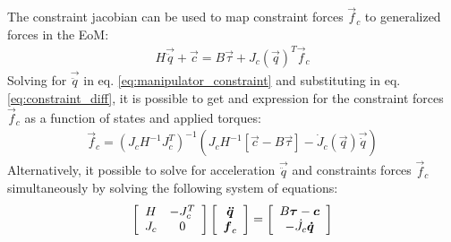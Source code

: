 The constraint jacobian can be used to map constraint forces $\vec{f}_c$ to generalized forces in the EoM:
%
\begin{align}
H \vec{\ddot{q}} + \vec{c} = B \vec{\tau} + J_c( \vec{ q } )^T  \vec{f}_c
\label{eq:manipulator_constraint}
\end{align}
%
Solving for $\vec{\ddot{q}}$ in eq. \eqref{eq:manipulator_constraint} and substituting in eq. \eqref{eq:constraint_diff}, it is possible to get and expression for the constraint forces $\vec{f}_c$ as a function of states and applied torques:
%
\begin{align}
\vec{f}_c = \left( J_c H^{-1} J_c^T \right)^{-1} \left(  J_c H^{-1} [\vec{c} - B \vec{\tau} ] - \dot{J}_c( \vec{ q } ) \vec{\dot{q}}   \right)
\label{eq:const_forces}
\end{align}
%
Alternatively, it possible to solve for acceleration $\vec{\ddot{q}}$ and constraints forces $\vec{f}_c$ simultaneously by solving the following system of equations:
%
\begin{align}
\left[ \begin{array}{c c } 	H & -J_c^T  \\ J_c 	& 0  	\end{array} \right] \left[ \begin{array}{c} \vec{\ddot{q}}  \\ \vec{f}_c \end{array} \right] = \left[ \begin{array}{c}  B \vec{\tau} - \vec{c}   \\ -\dot{J}_c \vec{\dot{q}}  \end{array} \right]
\label{eq:manipulator_constraint_eom}
\end{align}


